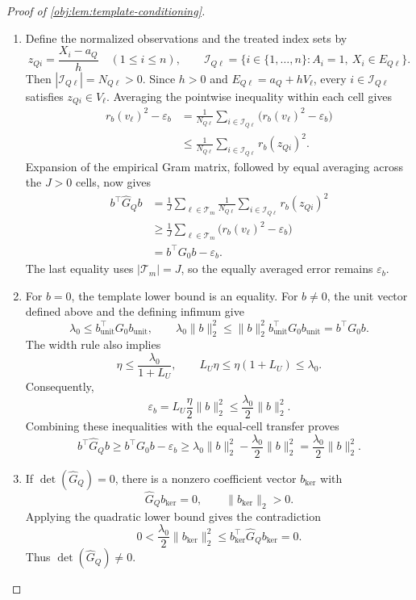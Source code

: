 \documentclass[11pt]{article}
\begin{document}
\begin{proof}[Proof of \cref{obj:lem:template-conditioning}]
\begin{enumerate}
\item Define the normalized observations and the treated index sets by
\[
z_{Qi}=\frac{X_i-a_Q}{h}\quad(1\le i\le n),
\qquad
\mathcal I_{Q\ell}
=\{i\in\{1,\ldots,n\}:A_i=1,\ X_i\in E_{Q\ell}\}.
\]
Then \(|\mathcal I_{Q\ell}|=N_{Q\ell}>0\). Since \(h>0\) and
\(E_{Q\ell}=a_Q+hV_\ell\), every \(i\in\mathcal I_{Q\ell}\) satisfies
\(z_{Qi}\in V_\ell\). Averaging the pointwise inequality within each cell gives
\[
\begin{aligned}
r_b(v_\ell)^2-\varepsilon_b
&=\frac1{N_{Q\ell}}\sum_{i\in\mathcal I_{Q\ell}}
\bigl(r_b(v_\ell)^2-\varepsilon_b\bigr)\\
&\le\frac1{N_{Q\ell}}\sum_{i\in\mathcal I_{Q\ell}}r_b(z_{Qi})^2.
\end{aligned}
\]
Expansion of the empirical Gram matrix, followed by equal averaging across the \(J>0\) cells, now gives
\[
\begin{aligned}
b^\top\widehat G_Qb
&=\frac1J\sum_{\ell\in\mathcal T_m}
\frac1{N_{Q\ell}}\sum_{i\in\mathcal I_{Q\ell}}r_b(z_{Qi})^2\\
&\ge\frac1J\sum_{\ell\in\mathcal T_m}
\bigl(r_b(v_\ell)^2-\varepsilon_b\bigr)\\
&=b^\top G_0b-\varepsilon_b.
\end{aligned}
\]
The last equality uses \(|\mathcal T_m|=J\), so the equally averaged error remains \(\varepsilon_b\).

\item For \(b=0\), the template lower bound is an equality. For \(b\ne0\), the unit vector defined above and the defining infimum give
\[
\lambda_0\le b_{\mathrm{unit}}^\top G_0b_{\mathrm{unit}},
\qquad
\lambda_0\|b\|_2^2
\le\|b\|_2^2b_{\mathrm{unit}}^\top G_0b_{\mathrm{unit}}
=b^\top G_0b.
\]
The width rule also implies
\[
\eta\le\frac{\lambda_0}{1+L_U},
\qquad
L_U\eta\le\eta(1+L_U)\le\lambda_0.
\]
Consequently,
\[
\varepsilon_b
=L_U\frac{\eta}{2}\|b\|_2^2
\le\frac{\lambda_0}{2}\|b\|_2^2.
\]
Combining these inequalities with the equal-cell transfer proves
\[
b^\top\widehat G_Qb
\ge b^\top G_0b-\varepsilon_b
\ge\lambda_0\|b\|_2^2-\frac{\lambda_0}{2}\|b\|_2^2
=\frac{\lambda_0}{2}\|b\|_2^2.
\]

\item If \(\det(\widehat G_Q)=0\), there is a nonzero coefficient vector \(b_{\ker}\) with
\[
\widehat G_Qb_{\ker}=0,
\qquad
\|b_{\ker}\|_2>0.
\]
Applying the quadratic lower bound gives the contradiction
\[
0<\frac{\lambda_0}{2}\|b_{\ker}\|_2^2
\le b_{\ker}^\top\widehat G_Qb_{\ker}=0.
\]
Thus \(\det(\widehat G_Q)\ne0\).


\end{enumerate}
\end{proof}
\end{document}
